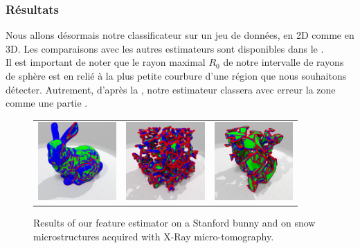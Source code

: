 \subsubsection{Résultats}%
\label{sec:applications:feature:II:results}
%
Nous allons désormais notre classificateur sur un jeu de données, en 2D comme en
3D. Les comparaisons avec les autres estimateurs sont disponibles dans le
.
%
\\
%
Il est important de noter que le rayon maximal $R_0$ de notre intervalle de
rayons de sphère est en relié à la plus petite courbure d'une région \featsmooth
que nous souhaitons détecter. Autrement, d'après la
, notre estimateur classera avec erreur la zone
comme une partie \featflat.
%
%
%
\begin{figure}[ht]
  \begin{center}
    \setlength{\tabcolsep}{1pt}
    \begin{tabular}{c c c}
      \includegraphics[width=3cm]{images/Feature/Bunny_512_II_scale} &
      \includegraphics[width=3cm]{images/Feature/Snow_I08_II_scale} &
      \includegraphics[width=3cm]{images/Feature/Snow_E2bis_II_scale} \\
    \end{tabular}
    \caption{Results of our feature estimator on a Stanford bunny and on snow microstructures acquired with X-Ray micro-tomography.\label{fig:feature-snow}}
  \end{center}
\end{figure}

